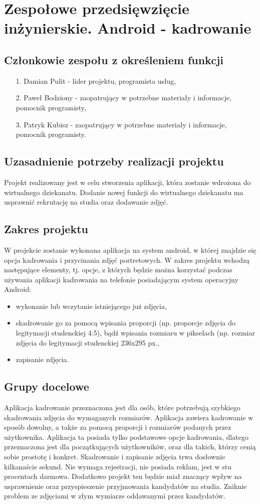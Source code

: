 \chapter {Zespołowe przedsięwzięcie inżynierskie. Android - kadrowanie}
\section{Członkowie zespołu z określeniem funkcji}
\begin{itemize}
\item [1.] Damian Pulit - lider projektu, programista usług,
\item [2.] Paweł Bodziony - zaopatrujący w potrzebne materiały i informacje, pomocnik programisty,
\item [3.] Patryk Kubisz - zaopatrujący w potrzebne materiały i informacje, pomocnik programisty. 
\end{itemize}
\section {Uzasadnienie potrzeby realizacji projektu}
Projekt realizowany jest w celu stworzenia aplikacji, która zostanie wdrożona do wirtualnego dziekanatu.
Dodanie nowej funkcji do wirtualnego dziekanatu ma usprawnić rekrutację na studia oraz dodawanie zdjęć.
\section {Zakres projektu}
W projekcie zostanie wykonana aplikacja na system android, w której znajdzie się opcja kadrowania i przycinania zdjęć portretowych. W zakres projektu wchodzą następujące elementy, tj. opcje, z których będzie można korzystać podczas używania aplikacji kadrowania na telefonie posiadającym system operacyjny Android:
\begin{itemize}
\item wykonanie lub wczytanie istniejącego już zdjęcia,
\item skadrowanie go za pomocą wpisania proporcji (np. proporcje zdjęcia do legitymacji studenckiej 4:5), bądź wpisania rozmiaru w pikselach (np. rozmiar zdjęcia do legitymacji studenckiej 236x295 px.,
\item zapisanie zdjęcia.
\end{itemize}
\newpage

\section{Grupy docelowe}
Aplikacja kadrowanie przeznaczona jest dla osób, które potrzebują szybkiego skadrowania zdjęcia do wymaganych rozmiarów. Aplikacja zawiera kadrowanie w sposób dowolny, a także za pomocą proporcji i rozmiarów podanych przez użytkownika. Aplikacja ta posiada tylko podstawowe opcje kadrowania, dlatego przeznaczona jest dla początkujących użytkowników, oraz dla takich, którzy cenią sobie prostotę i konkret. Skadrowanie i zapisanie zdjęcia trwa dosłownie kilkanaście sekund. Nie wymaga rejestracji, nie posiada reklam, jest w stu procentach darmowa. Dodatkowo projekt ten będzie miał znaczący wpływ na usprawnienie oraz przyspieszenie przyjmowania kandydatów na studia. Zniknie problem ze zdjęciami w złym wymiarze oddawanymi przez kandydatów.

